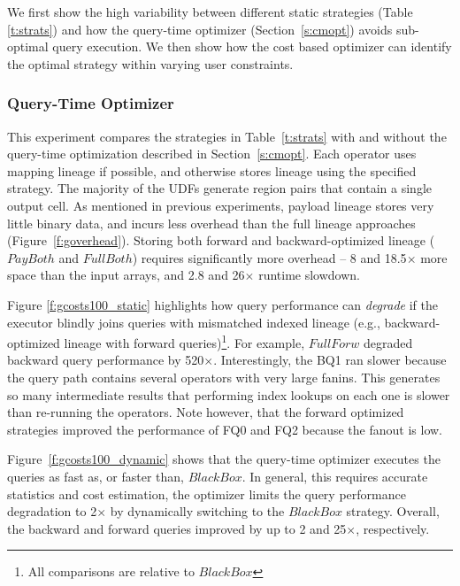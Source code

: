 We first show the high variability between different static strategies (Table
\ref{t:strats}) and how the query-time optimizer (Section~\ref{s:cmopt})
avoids sub-optimal query execution.  We then show how the \sys{} cost based
optimizer can identify the optimal strategy within varying user constraints.



\subsubsection{Query-Time Optimizer}
\label{s:genomicsfixed}

This experiment compares the strategies in Table~\ref{t:strats} with and
without the query-time optimization described in Section~\ref{s:cmopt}.  Each
operator uses mapping lineage if possible, and otherwise stores lineage
using the specified strategy.  The majority of the UDFs generate region pairs
that contain a single output cell.  As mentioned in previous experiments,
payload lineage stores very little binary data, and incurs less overhead
than the full lineage approaches (Figure~\ref{f:goverhead}).  Storing both
forward and backward-optimized lineage ($PayBoth$ and $FullBoth$) requires
significantly more overhead --  8 and 18.5$\times$ more space than the input
arrays, and 2.8 and 26$\times$ runtime slowdown.

Figure \ref{f:gcosts100_static} highlights how query performance can {\it
degrade} if the executor blindly joins queries with mismatched indexed lineage
(e.g., backward-optimized lineage with forward queries)\footnote{ All
comparisons are relative to $BlackBox$}.  For example, $FullForw$ degraded
backward query performance by 520$\times$.  Interestingly, the BQ1 ran slower
because the query path contains several operators with very large fanins.  This
generates so many intermediate results that performing index lookups on each
one is slower than re-running the operators.  Note however, that the forward
optimized strategies improved the performance of FQ0 and FQ2 because the fanout
is low.

Figure~\ref{f:gcosts100_dynamic} shows that the query-time optimizer executes
the queries as fast as, or faster than, $BlackBox$. In general, this
requires accurate statistics and cost estimation, the optimizer limits the
query performance degradation to 2$\times$ by dynamically switching to the
$BlackBox$ strategy.  Overall, the backward and forward queries improved by up
to 2 and 25$\times$, respectively.








